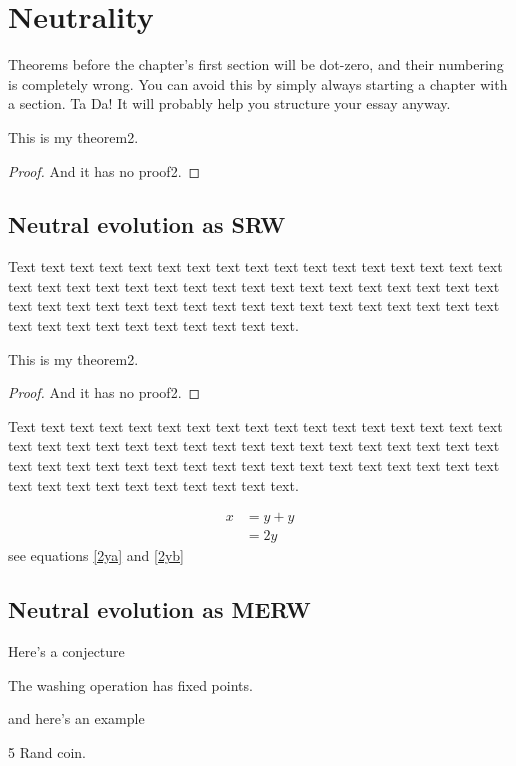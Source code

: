 \chapter{Neutrality}

Theorems before the chapter's first section will be dot-zero, 
and their numbering is completely wrong. You can avoid this
by simply always starting a chapter with a section. Ta Da! 
It will probably help you structure your essay anyway. 

\begin{thm}[My Theorem2]
This is my theorem2.
\end{thm}
\begin{proof}
And it has no proof2.
\end{proof}

\section{Neutral evolution as SRW}

Text text text text text text text text text text text text text text
text text text text text text text text text text text text text text
text text text text text text text text text text text text text text
text text text text text text text text text text text text text text
text text text text text.

\begin{thm}[My Theorem2]
This is my theorem2.
\end{thm}
\begin{proof}
And it has no proof2.
\end{proof}

Text text text text text text text text text text text text text text
text text text text text text text text text text text text text text
text text text text text text text text text text text text text text
text text text text text text text text text text text text text text
text text text text text.

\begin{align} %
\label{2ya}
x & = y + y\\
\label{2yb}
& = 2y
\end{align}
see equations \eqref{2ya} and \ref{2yb}

\section{Neutral evolution as MERW}

Here's a conjecture
\begin{conj}
The washing operation has fixed points.
\end{conj}

and here's an example

\begin{exa}
5 Rand coin.
\end{exa}


